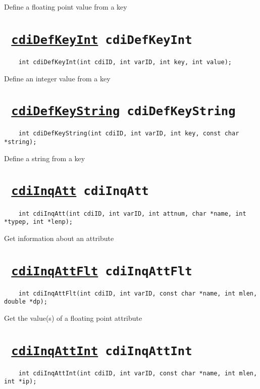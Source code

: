 Define a floating point value from a key
\ifpdfoutput{}{(\ref{cdiDefKeyFloat})}


\section*{\texttt{ 
\ifpdf
\hyperref[cdiDefKeyInt]{cdiDefKeyInt}
\else
cdiDefKeyInt
\fi
}}
\begin{verbatim}
    int cdiDefKeyInt(int cdiID, int varID, int key, int value);
\end{verbatim}

Define an integer value from a key
\ifpdfoutput{}{(\ref{cdiDefKeyInt})}


\section*{\texttt{ 
\ifpdf
\hyperref[cdiDefKeyString]{cdiDefKeyString}
\else
cdiDefKeyString
\fi
}}
\begin{verbatim}
    int cdiDefKeyString(int cdiID, int varID, int key, const char *string);
\end{verbatim}

Define a string from a key
\ifpdfoutput{}{(\ref{cdiDefKeyString})}


\section*{\texttt{ 
\ifpdf
\hyperref[cdiInqAtt]{cdiInqAtt}
\else
cdiInqAtt
\fi
}}
\begin{verbatim}
    int cdiInqAtt(int cdiID, int varID, int attnum, char *name, int *typep, int *lenp);
\end{verbatim}

Get information about an attribute
\ifpdfoutput{}{(\ref{cdiInqAtt})}


\section*{\texttt{ 
\ifpdf
\hyperref[cdiInqAttFlt]{cdiInqAttFlt}
\else
cdiInqAttFlt
\fi
}}
\begin{verbatim}
    int cdiInqAttFlt(int cdiID, int varID, const char *name, int mlen, double *dp);
\end{verbatim}

Get the value(s) of a floating point attribute
\ifpdfoutput{}{(\ref{cdiInqAttFlt})}


\section*{\texttt{ 
\ifpdf
\hyperref[cdiInqAttInt]{cdiInqAttInt}
\else
cdiInqAttInt
\fi
}}
\begin{verbatim}
    int cdiInqAttInt(int cdiID, int varID, const char *name, int mlen, int *ip);
\end{verbatim}

